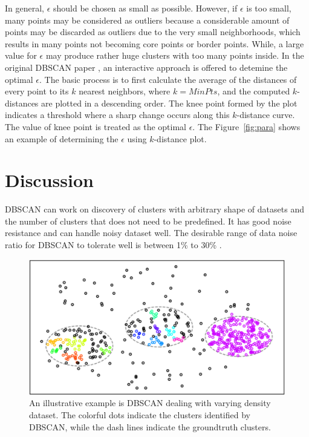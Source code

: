 In general, $\epsilon$ should be chosen as small as possible. However, if 
$\epsilon$ is too small, many points may be considered as outliers because a considerable amount of points may be discarded as outliers due to the very small neighborhoods, which results in many points not becoming core points or border points. While, a large value for $\epsilon$ may produce rather huge clusters with too many points inside.
In the original DBSCAN paper 
\cite{ester1996density}, an interactive approach is offered to detemine the 
optimal 
$\epsilon$.  The basic process is to first calculate the average of the 
distances of every point to its $k$ nearest neighbors, where $k = MinPts$, and 
the computed $k$-distances are plotted in a descending order. The knee point 
formed by the plot indicates a threshold where a sharp change occurs along this 
$k$-distance curve. The value of knee point is treated as the optimal 
$\epsilon$. The Figure~\ref{fig:para} shows an example of determining the 
$\epsilon$ using $k$-distance plot. 



\section{Discussion}

DBSCAN can work on discovery of clusters with arbitrary shape of datasets and 
the number of clusters that does not need to be predefined. It has good noise 
resistance and can handle noisy dataset well. The desirable range of data noise 
ratio for DBSCAN to tolerate well is between 1\% to 30\%
\cite{schubert2017dbscan}. 


\begin{figure}
	\centering
	\includegraphics[width=\textwidth]{"Part 3 - Learning Systems/Unsupervised Learning/DBScan/figures/var-density.png"}
	\caption{An illustrative example is DBSCAN dealing with varying density 
	dataset. The colorful dots indicate the clusters identified by DBSCAN, 
	while the dash lines indicate the groundtruth clusters.}
      \label{fig:varying}
\end{figure}

